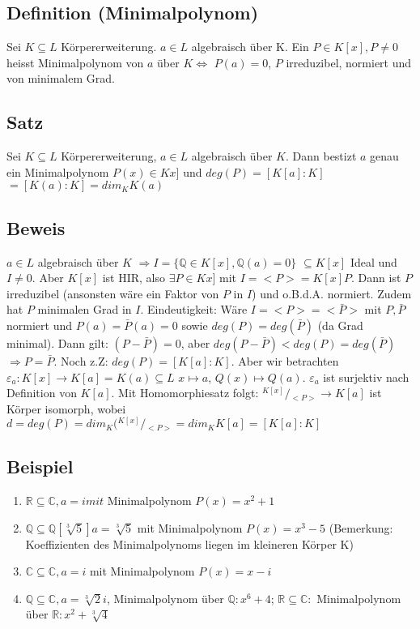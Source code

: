 \documentclass[12pt,a4paper,ngerman]{scrreprt}
\newcommand{\modulus}[2]{{}^{#1} \!/\!_{#2}}
\begin{document}
\subsection{Definition (Minimalpolynom)}
Sei $K \subseteq L$ Körpererweiterung. $a \in L$ algebraisch über K.
Ein $P \in K[x], P \neq 0$ heisst Minimalpolynom von $a$ über $K \Leftrightarrow$
$P(a) = 0$, $P$ irreduzibel, normiert und von minimalem Grad.

\subsection{Satz}
Sei $K \subseteq L$ Körpererweiterung, $a \in L$ algebraisch über $K$.
Dann bestizt $a$ genau ein Minimalpolynom $P(x) \in Kx]$ und $deg(P) = [K[a]:K]$
$= [K(a):K] = dim_K K(a)$

\subsection{Beweis}
$a \in L$ algebraisch über $K$ $\Rightarrow I = \{ \mathbb{Q} \in K[x], \mathbb{Q}(a) = 0\}$
$\subseteq K[x]$ Ideal und $I \neq 0$.
Aber $K[x]$ ist HIR, also $\exists P \in Kx]$ mit $I = <P> = K[x]P$.
Dann ist $P$ irreduzibel (ansonsten wäre ein Faktor von $P$ in $I$) und o.B.d.A. normiert.
Zudem hat $P$ minimalen Grad in $I$. 
Eindeutigkeit: Wäre $I = <P> = <\bar{P}>$ mit $P,\bar{P}$ normiert und $P(a)=\bar{P}(a)=0$
sowie $deg(P) = deg(\bar{P})$ (da Grad minimal).
Dann gilt: $(P-\bar{P}) = 0$, aber $deg(P-\bar{P}) < deg(P) = deg(\bar{P})$
$\Rightarrow P = \bar{P}$. Noch z.Z: $deg(P) = [K[a]:K]$. 
Aber wir betrachten $\varepsilon_a: K[x] \to K[a] = K(a) \subseteq L$
$x \mapsto a$, $Q(x) \mapsto Q(a)$.
$\varepsilon_a$ ist surjektiv nach Definition von $K[a]$. Mit Homomorphiesatz folgt:
$\modulus{K[x]}{<P>} \to K[a]$ ist Körper isomorph, 
wobei $d = deg(P) = dim_K(\modulus{K[x]}{<P>} = dim_K K[a] = [K[a]:K]$

\subsection{Beispiel}
\begin{enumerate}[(1)]
\item $\mathbb{R} \subseteq \mathbb{C}, a = i mit$ Minimalpolynom $P(x) = x^2 +1$
\item $\mathbb{Q} \subseteq \mathbb{Q}[\sqrt[3]{5}] a = \sqrt[3]{5}$
mit Minimalpolynom $P(x) = x^3 - 5$
(Bemerkung: Koeffizienten des Minimalpolynoms liegen im kleineren Körper K)
\item $\mathbb{C} \subseteq \mathbb{C}, a=i$ mit Minimalpolynom $P(x) = x-i$
\item $\mathbb{Q} \subseteq \mathbb{C}, a = \sqrt[3]{2}i$, 
Minimalpolynom über $\mathbb{Q}: x^6 + 4$;
$\mathbb{R} \subseteq \mathbb{C}:$ Minimalpolynom über $\mathbb{R}: x^2 + \sqrt[3]{4}$
\end{enumerate}

\end{document}
